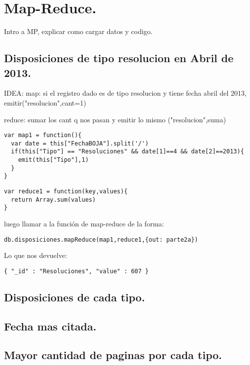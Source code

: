 \section{Map-Reduce.}
Intro a MP, explicar como cargar datos y codigo.

\subsection{Disposiciones de tipo resolucion en Abril de 2013.}
IDEA:
map:
si el registro dado es de tipo resolucion y tiene fecha abril del 2013, emitir("resolucion",cant=1)

reduce:
sumar los cant q nos pasan y emitir lo mismo ("resolucion",suma)

\begin{lstlisting}
var map1 = function(){
  var date = this["FechaBOJA"].split('/')
  if(this["Tipo"] == "Resoluciones" && date[1]==4 && date[2]==2013){
    emit(this["Tipo"],1)
  }
}
\end{lstlisting}

\begin{lstlisting}
var reduce1 = function(key,values){
  return Array.sum(values)
}
\end{lstlisting}

luego llamar a la función de map-reduce de la forma:
\begin{lstlisting}
db.disposiciones.mapReduce(map1,reduce1,{out: parte2a})
\end{lstlisting}

Lo que nos devuelve:

\begin{lstlisting}
{ "_id" : "Resoluciones", "value" : 607 }
\end{lstlisting}

\subsection{Disposiciones de cada tipo.}

\subsection{Fecha mas citada.}

\subsection{Mayor cantidad de paginas por cada tipo.}
